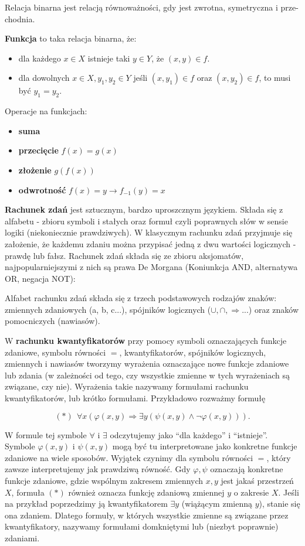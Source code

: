 \documentclass[../main.tex]{subfiles}
\begin{document}
Relacja binarna jest relacją równoważności, gdy jest zwrotna, symetryczna i prze-
chodnia.

\textbf{Funkcja} to taka relacja binarna, że:
\begin{itemize}
    \item dla każdego $x \in X$ istnieje taki $y \in Y$, że $(x,y) \in f$.
    \item dla dowolnych $x \in X, y_1,y_2 \in Y$ jeśli $(x,y_1) \in f$ oraz $(x,y_2) \in f$, to musi być $y_1 = y_2$.
\end{itemize}
Operacje na funkcjach:
\begin{itemize}
    \item \textbf{suma} 
    \item \textbf{przecięcie} $f(x) = g(x)$
    \item \textbf{złożenie} $g(f(x))$
    \item \textbf{odwrotność} $f(x) = y \rightarrow f_{-1}(y) = x$
\end{itemize}

\textbf{Rachunek zdań} jest sztucznym, bardzo uproszcznym językiem. Składa się z alfabetu - zbioru symboli i
stałych oraz formuł czyli poprawnych słów w sensie logiki (niekoniecznie prawdziwych). W klasycznym
rachunku zdań przyjmuje się założenie, że każdemu zdaniu można przypisać jedną z dwu wartości
logicznych - prawdę lub fałsz. Rachunek zdań składa się ze zbioru aksjomatów, najpopularniejszymi z
nich są prawa De Morgana (Koniunkcja AND, alternatywa OR, negacja NOT):

Alfabet rachunku zdań składa się z trzech podstawowych rodzajów znaków: zmiennych zdaniowych (a, b, c...), spójników logicznych ($\cup, \cap, \Rightarrow$...) oraz znaków pomocniczych (nawiasów).

W \textbf{rachunku kwantyfikatorów} przy pomocy symboli oznaczających funkcje zdaniowe, symbolu równości $=$, kwantyfikatorów, spójników logicznych, zmiennych i nawiasów tworzymy wyrażenia oznaczające nowe funkcje zdaniowe lub zdania (w zależności od tego, czy wszystkie zmienne w tych wyrażeniach są związane, czy nie). Wyrażenia takie nazywamy formułami rachunku kwantyfikatorów, lub krótko formułami. Przykładowo rozważmy formułę

\begin{displaymath}(*)\ \ \forall x(\varphi(x,y)\Rightarrow\exists y(\psi(x,y)\land\neg\varphi(x,y))).\end{displaymath}

W formule tej symbole $\forall$ i $\exists$ odczytujemy jako ``dla każdego'' i ``istnieje''. Symbole $\varphi(x,y)$ i $\psi(x,y)$ mogą być tu interpretowane jako konkretne funkcje zdaniowe na wiele sposobów. Wyjątek czynimy dla symbolu równości $=$, który zawsze interpretujemy jak prawdziwą równość. Gdy $\varphi,\psi$ oznaczają konkretne funkcje zdaniowe, gdzie wspólnym zakresem zmiennych $x,y$ jest jakaś przestrzeń $X$, formuła $(*)$ również oznacza funkcję zdaniową zmiennej $y$ o zakresie $X$. Jeśli na przykład poprzedzimy ją kwantyfikatorem $\exists y$ (wiążącym zmienną $y$), stanie się ona zdaniem. Dlatego formuły, w których wszystkie zmienne są związane przez kwantyfikatory, nazywamy formułami domkniętymi lub (niezbyt poprawnie) zdaniami. 
\end{document}
